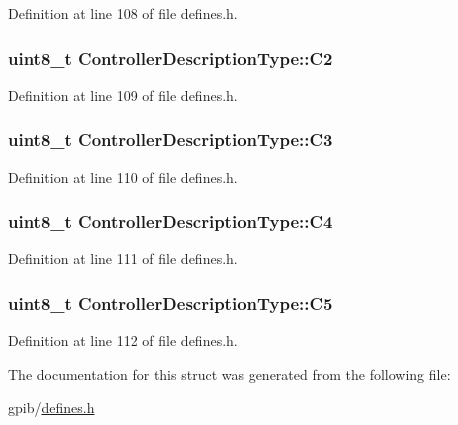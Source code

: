 Definition at line 108 of file defines.\+h.

\subsubsection[{\texorpdfstring{C2}{C2}}]{\setlength{\rightskip}{0pt plus 5cm}uint8\+\_\+t Controller\+Description\+Type\+::\+C2}\hypertarget{structControllerDescriptionType_ae2ac8a001bde9c68f92c6bb3a7287517}{}\label{structControllerDescriptionType_ae2ac8a001bde9c68f92c6bb3a7287517}


Definition at line 109 of file defines.\+h.

\subsubsection[{\texorpdfstring{C3}{C3}}]{\setlength{\rightskip}{0pt plus 5cm}uint8\+\_\+t Controller\+Description\+Type\+::\+C3}\hypertarget{structControllerDescriptionType_ad24f2f797685ffd8f0bc96a800e5a6a8}{}\label{structControllerDescriptionType_ad24f2f797685ffd8f0bc96a800e5a6a8}


Definition at line 110 of file defines.\+h.

\subsubsection[{\texorpdfstring{C4}{C4}}]{\setlength{\rightskip}{0pt plus 5cm}uint8\+\_\+t Controller\+Description\+Type\+::\+C4}\hypertarget{structControllerDescriptionType_abc2badc5707de3327d15a00919fb7e08}{}\label{structControllerDescriptionType_abc2badc5707de3327d15a00919fb7e08}


Definition at line 111 of file defines.\+h.

\subsubsection[{\texorpdfstring{C5}{C5}}]{\setlength{\rightskip}{0pt plus 5cm}uint8\+\_\+t Controller\+Description\+Type\+::\+C5}\hypertarget{structControllerDescriptionType_a5b520889371f53fb89e36a0de5f071e9}{}\label{structControllerDescriptionType_a5b520889371f53fb89e36a0de5f071e9}


Definition at line 112 of file defines.\+h.



The documentation for this struct was generated from the following file\+:\begin{DoxyCompactItemize}
\item 
gpib/\hyperlink{defines_8h}{defines.\+h}\end{DoxyCompactItemize}
